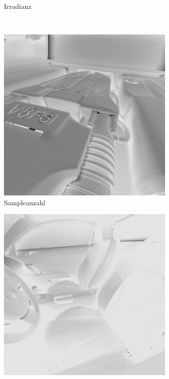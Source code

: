 \begin{figure}[h]
\begin{subfigure}[t]{0.5\textwidth}
				\caption{Irradianz}
			\end{subfigure}
			\medskip \\
			\begin{subfigure}[t]{0.5\textwidth}
				\center
				\includegraphics[width=0.95\textwidth]{pic/irr_est-ra-r8_3-scount.png}
				\caption{Sampleanzahl}
			\end{subfigure}
			\begin{subfigure}[t]{0.5\textwidth}
				\center
				\includegraphics[width=0.95\textwidth]{pic/irr_est-ra-r8_4-scount.png}

\end{subfigure}
\end{figure}
